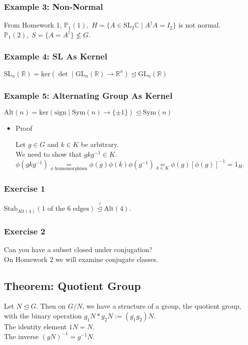 \documentclass[11pt]{article}
\newcommand{\0}{\emptyset}
\newcommand{\R}{\mathbb{R}}
\newcommand{\C}{\mathbb{C}}
\newcommand{\PP}{\mathbb{P}}
\begin{document}
\subsubsection*{Example 3: Non-Normal}
\label{sec:orgd3ff054}
From Homework 1, \(\PP_{1}(1),\;H=\{A\in\text{SL}_{2}\C\;|\; A^{\dagger}A=I_{2}\}\) is not normal.\\[0pt]
\(\PP_{1}(2),\;S=\{A=A^{\dagger}\}\nleq G\).\\[0pt]
\subsubsection*{Example 4: SL As Kernel}
\label{sec:orgc9e3265}
\(\text{SL}_{n}(\R)=\text{ker}(\det\;|\;\text{GL}_{n}(\R)\to\R^{x})\trianglelefteq\text{GL}_{n}(\R)\)\\[0pt]
\subsubsection*{Example 5: Alternating Group As Kernel}
\label{sec:orgdfcb3f7}
\(\text{Alt}(n)=\text{ker}(\text{sign}\;|\;\text{Sym}(n)\to\{\pm 1\})\trianglelefteq\text{Sym}(n)\)\\[0pt]
\begin{itemize}
\item Proof
\label{sec:org7b4f0cc}

Let \(g\in G\) and \(k\in K\) be arbitrary.\\[0pt]
We need to show that \(gkg^{-1}\in K\).\\[0pt]
\(\phi(gkg^{-1})\underset{\phi\text{ homomorphism}}{=}\phi(g)\phi(k)\phi(g^{-1})\underset{k\in K}{=}\phi(g)[\phi(g)]^{-1}=1_{H}\).\\[0pt]
\end{itemize}
\subsubsection*{Exercise 1}
\label{sec:org1234e2a}
\(\text{Stab}_{\text{Alt}(4)}(\text{1 of the 6 edges})\overset{?}{\trianglelefteq}\text{Alt}(4)\).\\[0pt]
\subsubsection*{Exercise 2}
\label{sec:org40f1ba3}
Can you have a subset closed under conjugation?\\[0pt]
On Homework 2 we will examine conjugate classes.\\[0pt]
\subsection*{Theorem: Quotient Group}
\label{sec:orgfadd011}
Let \(N\trianglelefteq G\). Then on \(G/N\), we have a structure of a group, the quotient group, with the binary operation \(g_{1}N*g_{2}N:=(g_{1}g_{2})N\).\\[0pt]
The identity element \(1N=N\).\\[0pt]
The inverse \((gN)^{-1}=g^{-1}N\).\\[0pt]
\end{document}
